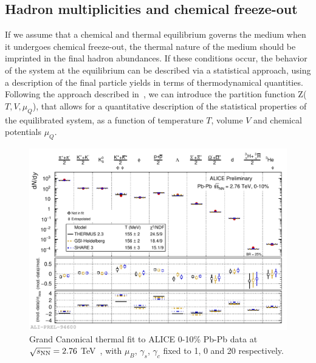 \subsection{Hadron multiplicities and chemical freeze-out}
\label{sec:chemFO}
If we assume that a chemical and thermal equilibrium governs the medium when it
 undergoes chemical freeze-out, the thermal nature of the medium 
 should be imprinted in the final hadron abundances. 
 If these conditions occur, the behavior of the system at the 
 equilibrium can be described via a statistical approach, using a description 
 of the final particle yields in terms of thermodynamical quantities. 
 Following the approach described in~\cite{BraunMunzinger:2003zd}, 
 we can introduce the partition function Z($T,V,\mu_{Q}$), that 
 allows for a quantitative description of the statistical properties 
 of the equilibrated system, as a function of temperature $T$, 
 volume $V$ and chemical potentials $\mu_{Q}$. 
\begin{figure}[!ht]
  \centering
  \includegraphics[width=12cm]{FigCap1/GCThermalFit_PbPb010.pdf}
  \caption{Grand Canonical thermal fit to ALICE 0-10\% Pb-Pb data at $\sqrt{s_{\rm NN}} = 2.76$ TeV~\cite{Floris:2014pta}, with $\mu_{B}$, $\gamma_{s}$, $\gamma_{c}$ fixed to 1, 0 and 20 respectively. }
  \label{fig:GCThermalFit_PbPb010}
\end{figure}

